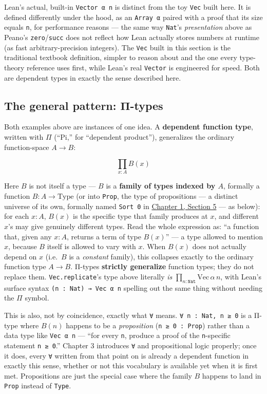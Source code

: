 Lean's actual, built-in \texttt{Vector α n} is distinct from the toy \texttt{Vec} built here. It is defined differently under the hood, as an \texttt{Array α} paired with a proof that its size equals \texttt{n}, for performance reasons --- the same way \texttt{Nat}'s \emph{presentation} above as Peano's \texttt{zero}/\texttt{succ} does not reflect how Lean actually stores numbers at runtime (as fast arbitrary-precision integers). The \texttt{Vec} built in this section is the traditional textbook definition, simpler to reason about and the one every type-theory reference uses first, while Lean's real \texttt{Vector} is engineered for speed. Both are dependent types in exactly the sense described here.

\subsection{The general pattern: Π-types}\label{sec:01-basics:03-dependent-types:7}

Both examples above are instances of one idea. A \textbf{dependent function type}, written with \(\Pi\) (``Pi,'' for ``dependent product''), generalizes the ordinary function-space \(A \to B\):

\[
\prod_{x : A} B(x)
\]

Here \(B\) is not itself a type --- \(B\) is a \textbf{family of types indexed by \(A\)}, formally a function \(B : A \to \mathrm{Type}\) (or into \texttt{Prop}, the type of propositions --- a distinct universe of its own, formally named \texttt{Sort 0} in \hyperref[sec:01-basics:05-pi-sigma-and-coc:1]{Chapter 1, Section 5} --- as below): for each \(x : A\), \(B(x)\) is the specific type that family produces at \(x\), and different \(x\)'s may give genuinely different types. Read the whole expression as: ``a function that, given any \(x : A\), returns a term of type \(B(x)\)'' --- a type allowed to mention \(x\), because \(B\) itself is allowed to vary with \(x\). When \(B(x)\) does not actually depend on \(x\) (i.e.~\(B\) is a \emph{constant} family), this collapses exactly to the ordinary function type \(A \to B\). Π-types \textbf{strictly generalize} function types; they do not replace them. \texttt{Vec.replicate}'s type above literally \emph{is} \(\prod_{n : \mathtt{Nat}} \mathrm{Vec}\,\alpha\,n\), with Lean's surface syntax \texttt{(n : Nat) → Vec α n} spelling out the same thing without needing the \(\Pi\) symbol.

This is also, not by coincidence, exactly what \texttt{∀} means. \texttt{∀ n : Nat, n ≥ 0} is a Π-type where \(B(n)\) happens to be a \emph{proposition} (\texttt{n ≥ 0 : Prop}) rather than a data type like \texttt{Vec α n} --- ``for every \texttt{n}, produce a proof of the \texttt{n}-specific statement \texttt{n ≥ 0}.'' Chapter 3 introduces \texttt{∀} and propositional logic properly; once it does, every \texttt{∀} written from that point on is already a dependent function in exactly this sense, whether or not this vocabulary is available yet when it is first met. Propositions are just the special case where the family \(B\) happens to land in \texttt{Prop} instead of \texttt{Type}.

